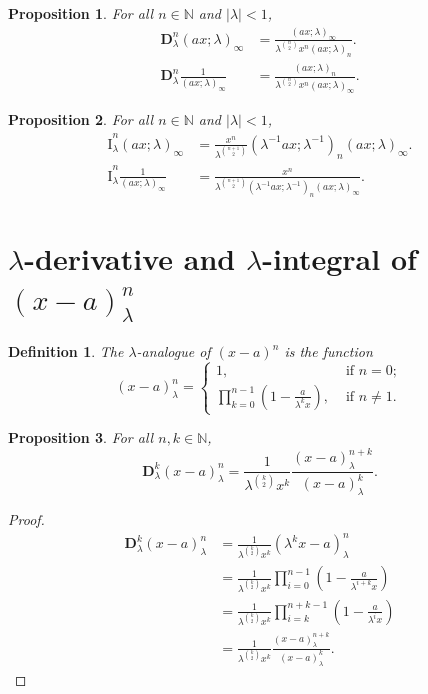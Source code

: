 \documentclass[12pt]{article}
\newcommand{\N}{\mathbb{N}}
\newcommand{\I}{\widehat{\mathrm{I}}}
\newcommand{\D}{\mathbf{D}}
\newtheorem{definition}{Definition}
\newtheorem{proposition}{Proposition}
\begin{document}
\begin{proposition}
For all $n\in\N$ and $\vert\lambda\vert<1$,
    \begin{align*}
        \D_{\lambda}^{n}(ax;\lambda)_{\infty}&=\frac{(ax;\lambda)_{\infty}}{\lambda^{\binom{n}{2}}x^n(ax;\lambda)_{n}}.\\
        \D_{\lambda}^{n}\frac{1}{(ax;\lambda)_{\infty}}&=\frac{(ax;\lambda)_{n}}{\lambda^{\binom{n}{2}}x^n(ax;\lambda)_{\infty}}.
    \end{align*}
\end{proposition}

\begin{proposition}
For all $n\in\N$ and $\vert\lambda\vert<1$,
    \begin{align*}
        \I_{\lambda}^{n}(ax;\lambda)_{\infty}&=\frac{x^n}{\lambda^{\binom{n+1}{2}}}(\lambda^{-1}ax;\lambda^{-1})_{n}(ax;\lambda)_{\infty}.\\
        \I_{\lambda}^{n}\frac{1}{(ax;\lambda)_{\infty}}&=\frac{x^n}{\lambda^{\binom{n+1}{2}}(\lambda^{-1}ax;\lambda^{-1})_{n}(ax;\lambda)_{\infty}}.
    \end{align*}
\end{proposition}

\section{$\lambda$-derivative and $\lambda$-integral of $(x-a)_{\lambda}^n$}\label{sec5}

\begin{definition}
The $\lambda$-analogue of $(x-a)^n$ is the function
    \begin{equation}
        (x-a)_{\lambda}^{n}=
        \begin{cases}
            1,&\text{ if }n=0;\\
            \prod_{k=0}^{n-1}\left(1-\frac{a}{\lambda^kx}\right),&\text{ if }n\neq1.
        \end{cases}
    \end{equation}
\end{definition}


\begin{proposition}
For all $n,k\in\N$,
    \begin{equation}
        \mathbf{D}_{\lambda}^k(x-a)_{\lambda}^n=\frac{1}{\lambda^{\binom{k}{2}}x^k}\frac{(x-a)_{\lambda}^{n+k}}{(x-a)_{\lambda}^k}.
    \end{equation}
\end{proposition}
\begin{proof}
    \begin{align*}
        \mathbf{D}_{\lambda}^{k}(x-a)_{\lambda}^n&=\frac{1}{\lambda^{\binom{k}{2}}x^k}(\lambda^k x-a)_{\lambda}^n\\
        &=\frac{1}{\lambda^{\binom{k}{2}}x^k}\prod_{i=0}^{n-1}\left(1-\frac{a}{\lambda^{i+k}x}\right)\\
        &=\frac{1}{\lambda^{\binom{k}{2}}x^k}\prod_{i=k}^{n+k-1}\left(1-\frac{a}{\lambda^{i}x}\right)\\
        &=\frac{1}{\lambda^{\binom{k}{2}}x^k}\frac{(x-a)_{\lambda}^{n+k}}{(x-a)_{\lambda}^k}.
    \end{align*}
\end{proof}
\end{document}
